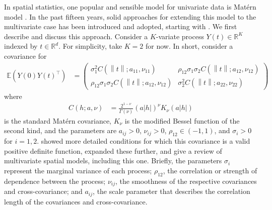 \documentclass[11pt]{article}
\begin{document}
In spatial statistics, one popular and sensible model for univariate data is Mat\'ern model \citep{stein_interpolation_2013, lindgren_explicit_2011}. In the past fifteen years, solid approaches for extending this model to the multivariate case has been introduced and adopted, starting with \cite{gneiting_matern_2010}. 
We first describe and discuss this approach. 
Consider a $K$-variate process $Y(t) \in \mathbb{R}^K$ indexed by $t \in \mathbb{R}^d$. For simplicity, take $K = 2$ for now. In short, \cite{gneiting_matern_2010} consider a covariance for \begin{align*}
\mathbb{E}(Y(0) Y(t)^\top) &= \begin{pmatrix} \sigma_1^2 C( \left\lVert t\right\rVert ; a_{11},\nu_{11}) &  \rho_{12}\sigma_1 \sigma_2 C(  \left\lVert t\right\rVert ; a_{12},\nu_{12}) \\ 
\rho_{12}\sigma_1 \sigma_2 C(  \left\lVert t\right\rVert ; a_{12},\nu_{12}) &
\sigma_2^2C(  \left\lVert t\right\rVert ; a_{22},\nu_{22})\end{pmatrix}
\end{align*}where \begin{align*}
C( h ; a,\nu) &= \frac{2^{1 - \nu}}{\Gamma(\nu)} ( a |h|)^{\nu} K_\nu(a|h|)
\end{align*}is the standard Mat\'ern covariance, $K_\nu$ is the modified Bessel function of the second kind, and the parameters are $a_{ij} > 0$, $\nu_{ij} > 0$, $\rho_{12} \in (-1,1)$, and $\sigma_i > 0$ for $i=1,2$. \cite{apanasovich_valid_2012} showed more detailed conditions for which this covariance is a valid positive definite function, \cite{emery_flexible_2021} expanded these further, and \cite{genton_cross-covariance_2015} give a review of multivariate spatial models, including this one. Briefly, the parameters $\sigma_i$ represent the marginal variance of each process; $\rho_{12}$, the correlation or strength of dependence between the process; $\nu_{ij}$, the smoothness of the respective covariances and cross-covariance; and $a_{ij}$, the scale parameter that describes the correlation length of the covariances and cross-covariance. %
\end{document}
